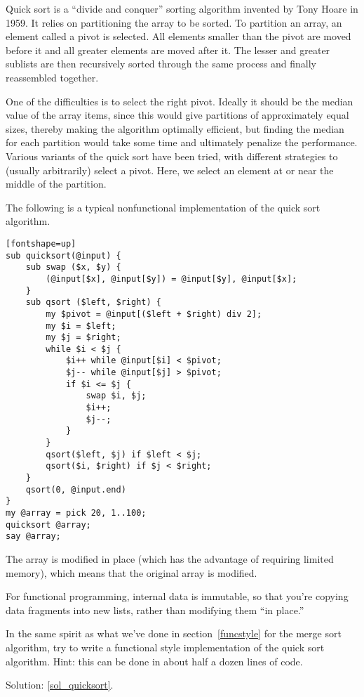 \begin{exercise}
Quick sort is a ``divide and conquer'' sorting algorithm invented 
by Tony Hoare in 1959. It relies on partitioning the array 
to be sorted. To partition an array, an element called a pivot 
is selected. All elements smaller than the pivot are moved before 
it and all greater elements are moved after it. The lesser and 
greater sublists are then recursively sorted through the same 
process and finally reassembled together.

One of the difficulties is to select the right pivot. Ideally 
it should be the median value of the array items, since this would 
give partitions of approximately equal sizes, thereby making 
the algorithm optimally efficient, but finding the 
median for each partition would take some time and ultimately 
penalize the performance. Various variants of the quick sort 
have been tried, with different strategies to (usually 
arbitrarily) select a pivot. Here, we select an element at or near 
the middle of the partition.

The following is a typical nonfunctional implementation 
of the quick sort algorithm.

\begin{verbatim}[fontshape=up]
sub quicksort(@input) {
    sub swap ($x, $y) {
        (@input[$x], @input[$y]) = @input[$y], @input[$x];
    }
    sub qsort ($left, $right) {
        my $pivot = @input[($left + $right) div 2];
        my $i = $left;
        my $j = $right;
        while $i < $j {
            $i++ while @input[$i] < $pivot;
            $j-- while @input[$j] > $pivot;
            if $i <= $j {
                swap $i, $j;
                $i++;
                $j--;
            }
        }
        qsort($left, $j) if $left < $j;
        qsort($i, $right) if $j < $right;
    }
    qsort(0, @input.end)
}
my @array = pick 20, 1..100;
quicksort @array;
say @array;
\end{verbatim}

The array is modified in place (which has the advantage of 
requiring limited memory), which means that the original array 
is modified. 

For functional programming, internal data is immutable, so that 
you're copying data fragments into new lists, rather than modifying 
them ``in place.''

In the same spirit as what we've done in section~\ref{funcstyle} 
for the merge sort algorithm, try to write a functional style 
implementation of the quick sort algorithm. Hint: this can be 
done in about half a dozen lines of code. 

Solution: \ref{sol_quicksort}.

\end{exercise}

